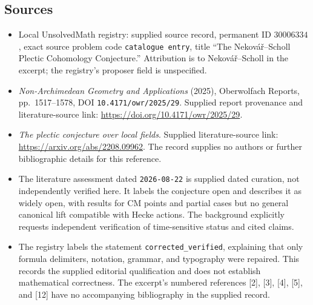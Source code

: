 \documentclass[11pt]{article}
\begin{document}
\subsection{Sources}
\begin{itemize}
\item Local UnsolvedMath registry: supplied source record, permanent ID \(30006334\), exact source problem code \texttt{catalogue entry}, title ``The Nekov\'a\v{r}--Scholl Plectic Cohomology Conjecture.'' Attribution is to Nekov\'a\v{r}--Scholl in the excerpt; the registry's proposer field is unspecified.
\item \emph{Non-Archimedean Geometry and Applications} (2025), Oberwolfach Reports, pp.~1517--1578, DOI \texttt{10.4171/owr/2025/29}. Supplied report provenance and literature-source link: \url{https://doi.org/10.4171/owr/2025/29}.
\item \emph{The plectic conjecture over local fields}. Supplied literature-source link: \url{https://arxiv.org/abs/2208.09962}. The record supplies no authors or further bibliographic details for this reference.
\item The literature assessment dated \texttt{2026-08-22} is supplied dated curation, not independently verified here. It labels the conjecture open and describes it as widely open, with results for CM points and partial cases but no general canonical lift compatible with Hecke actions. The background explicitly requests independent verification of time-sensitive status and cited claims.
\item The registry labels the statement \texttt{corrected\_verified}, explaining that only formula delimiters, notation, grammar, and typography were repaired. This records the supplied editorial qualification and does not establish mathematical correctness. The excerpt's numbered references [2], [3], [4], [5], and [12] have no accompanying bibliography in the supplied record.
\end{itemize}
\end{document}
